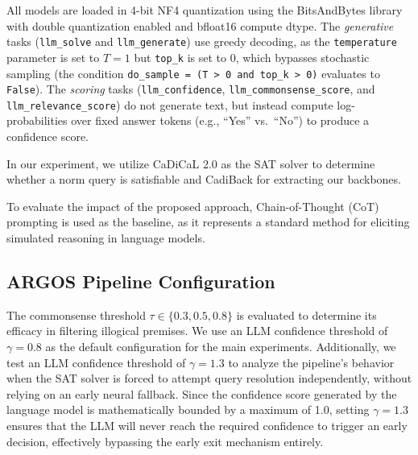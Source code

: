 All models are loaded in 4-bit NF4 quantization using the BitsAndBytes library with double quantization enabled and bfloat16 compute dtype. The \textit{generative} tasks (\texttt{llm\_solve} and \texttt{llm\_generate}) use greedy decoding, as the \texttt{temperature} parameter is set to $T=1$ but \texttt{top\_k} is set to 0, which bypasses stochastic sampling (the condition \texttt{do\_sample = (T > 0 and top\_k > 0)} evaluates to \texttt{False}). The \textit{scoring} tasks (\texttt{llm\_confidence}, \texttt{llm\_commonsense\_score}, and \texttt{llm\_relevance\_score}) do not generate text, but instead compute log-probabilities over fixed answer tokens (e.g., ``Yes'' vs.\ ``No'') to produce a confidence score.

In our experiment, we utilize CaDiCaL 2.0 \citep{biere2024cadical} as the SAT solver to determine whether a norm query is satisfiable and CadiBack \citep{biere2023cadiback} for extracting our backbones.

To evaluate the impact of the proposed approach, Chain-of-Thought (CoT) prompting is used as the baseline, as it represents a standard method for eliciting simulated reasoning in language models.



\subsection{ARGOS Pipeline Configuration}
\label{sec:argosConfig}
The commonsense threshold $\tau \in \{0.3, 0.5, 0.8\}$ is evaluated to determine its efficacy in filtering illogical premises. We use an LLM confidence threshold of $\gamma = 0.8$ as the default configuration for the main experiments. Additionally, we test an LLM confidence threshold of $\gamma = 1.3$ to analyze the pipeline's behavior when the SAT solver is forced to attempt query resolution independently, without relying on an early neural fallback. Since the confidence score generated by the language model is mathematically bounded by a maximum of 1.0, setting $\gamma = 1.3$ ensures that the LLM will never reach the required confidence to trigger an early decision, effectively bypassing the early exit mechanism entirely.



